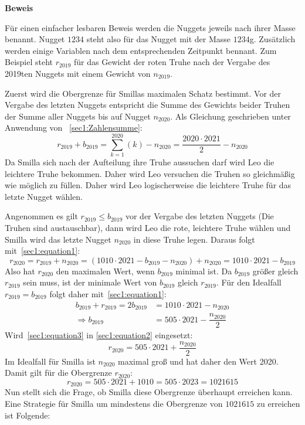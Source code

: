 \documentclass[10pt, a4paper]{amsart}
\makeatletter
\renewcommand\proofname{Beweis}
\renewenvironment{proof}[1][\proofname]{\par
\pushQED{\qed}%
\normalfont \topsep6\p@\@plus6\p@\relax
\trivlist
\item\relax
{\bfseries#1}\hspace\labelsep\ignorespaces
}{%
\popQED\endtrivlist\@endpefalse
}
\makeatother
\begin{document}
\begin{proof}
  Für einen einfacher lesbaren Beweis werden die Nuggets jeweils nach ihrer
  Masse benannt. Nugget $1234$ steht also für das Nugget mit der Masse $1234$g.
  Zusätzlich werden einige Variablen nach dem entsprechenden Zeitpunkt bennant.
  Zum Beispiel steht $r_{2019}$ für das Gewicht der roten Truhe nach der Vergabe
  des 2019ten Nuggets mit einem Gewicht von $n_{2019}$.
  
  Zuerst wird die Obergrenze für Smillas maximalen Schatz bestimmt. Vor der
  Vergabe des letzten Nuggets entspricht die Summe des Gewichts beider Truhen
  der Summe aller Nuggets bis auf Nugget $n_{2020}$. Als Gleichung geschrieben
  unter Anwendung von ~\autoref{sec1:Zahlensumme}:
  \begin{equation}\label{sec1:equation1}
    r_{2019}+b_{2019}=\sum_{k=1}^{2020}\left(k\right)-n_{2020}=\dfrac{2020\cdot2021}{2}-n_{2020}
  \end{equation}
  Da Smilla sich nach der Aufteilung ihre Truhe aussuchen darf wird Leo die
  leichtere Truhe bekommen. Daher wird Leo versuchen die Truhen
  so gleichmäßig wie möglich zu füllen. Daher wird Leo logischerweise die
  leichtere Truhe für das letzte Nugget wählen.

  Angenommen es gilt $r_{2019}\leq b_{2019}$ vor der Vergabe des letzten Nuggets (Die Truhen sind
  austauschbar), dann wird Leo die rote, leichtere Truhe wählen und Smilla wird das letzte
  Nugget $n_{2020}$ in diese Truhe legen. Daraus folgt mit~\eqref{sec1:equation1}:
  \begin{equation}\label{sec1:equation2}
    r_{2020}=r_{2019}+n_{2020}=(1010\cdot2021-b_{2019}-n_{2020})+n_{2020}=1010\cdot2021-b_{2019}
  \end{equation}
  Also hat $r_{2020}$ den maximalen Wert, wenn $b_{2019}$ minimal ist. Da
  $b_{2019}$ größer gleich $r_{2019}$ sein muss, ist der minimale Wert von
  $b_{2019}$ gleich $r_{2019}$. Für den Idealfall $r_{2019}=b_{2019}$ folgt daher
  mit~\eqref{sec1:equation1}:
  \begin{equation}\label{sec1:equation3}
    \begin{split}
      b_{2019} + r_{2019}= 2b_{2019} &=1010\cdot2021-n_{2020}\\
      \Rightarrow b_{2019} &=505\cdot2021-\dfrac{n_{2020}}{2}
    \end{split}
  \end{equation}
  Wird~\eqref{sec1:equation3} in \eqref{sec1:equation2} eingesetzt:
  \begin{equation*}
    r_{2020}=505\cdot2021+\dfrac{n_{2020}}{2}
  \end{equation*}
  Im Idealfall für Smilla ist $n_{2020}$ maximal groß und hat daher den Wert
  2020. Damit gilt für die Obergrenze $r_{2020}$:
  \begin{equation*}
    r_{2020}=505\cdot2021+1010 = 505\cdot2023 = 1021615
  \end{equation*}
  Nun stellt sich die Frage, ob Smilla diese Obergrenze überhaupt erreichen
  kann. Eine Strategie für Smilla um mindestens die Obergrenze von $1021615$ zu erreichen ist Folgende:


\end{proof}
\end{document}
